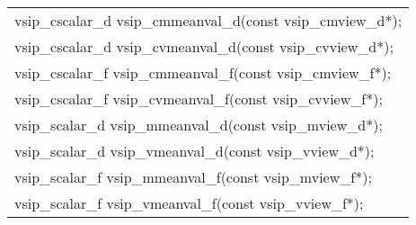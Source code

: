 \\\cvsiplh
\afh
\\\hspace*{.04\textwidth} {
\ttfamily
\begin{tabular}[H]{l}
vsip\_cscalar\_d vsip\_cmmeanval\_d(const vsip\_cmview\_d*);\\
vsip\_cscalar\_d vsip\_cvmeanval\_d(const vsip\_cvview\_d*);\\
vsip\_cscalar\_f vsip\_cmmeanval\_f(const vsip\_cmview\_f*);\\
vsip\_cscalar\_f vsip\_cvmeanval\_f(const vsip\_cvview\_f*);\\
vsip\_scalar\_d vsip\_mmeanval\_d(const vsip\_mview\_d*);\\
vsip\_scalar\_d vsip\_vmeanval\_d(const vsip\_vview\_d*);\\
vsip\_scalar\_f vsip\_mmeanval\_f(const vsip\_mview\_f*);\\
vsip\_scalar\_f vsip\_vmeanval\_f(const vsip\_vview\_f*);\\
\end{tabular}
}
\\\pyjvsiph
{}
